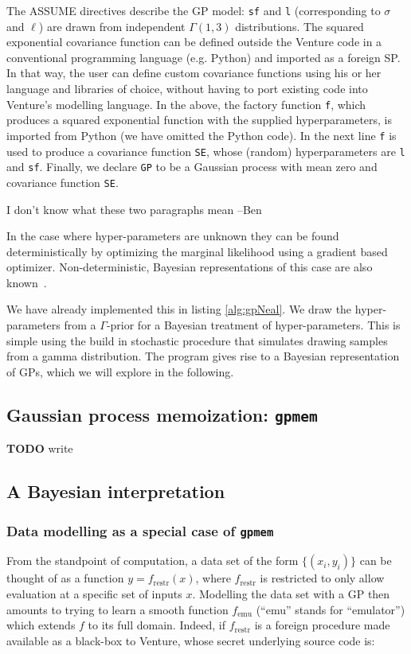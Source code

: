 \documentclass{article} %
\newcommand{\gpmem}{\texttt{gpmem}}
\newcommand{\emu}{{\textrm{emu}}}
\newcommand{\restr}{{\textrm{restr}}}
\begin{document}
The ASSUME directives describe the GP model: \texttt{sf} and \texttt{l} (corresponding to $\sigma$ and $\ell$) are drawn from independent $\Gamma(1,3)$ distributions.
The squared exponential covariance function can be defined outside the Venture code in a conventional programming language (e.g. Python) and imported as a foreign SP.
In that way, the user can define custom covariance functions using his or her language and libraries of choice, without having to port existing code into Venture's modelling language.
In the above, the factory function \texttt{f}, which produces a squared exponential function with the supplied hyperparameters, is imported from Python (we have omitted the Python code).
In the next line \texttt{f} is used to produce a covariance function \texttt{SE}, whose (random) hyperparameters are \texttt{l} and \texttt{sf}.
Finally, we declare \texttt{GP} to be a Gaussian process with mean zero and covariance function \texttt{SE}.





{\color{red} I don't know what these two paragraphs mean --Ben}

In the case where hyper-parameters are unknown they can be found deterministically by optimizing the marginal likelihood using a gradient based optimizer. Non-deterministic, Bayesian representations of this case are also known~\citep{neal1997monte}. 

We have already implemented this in listing \ref{alg:gpNeal}. We draw the hyper-parameters from a $\Gamma$-prior for a Bayesian treatment of hyper-parameters. This is simple using the build in stochastic procedure that simulates drawing samples from a gamma distribution.
The program gives rise to a Bayesian representation of GPs, which we will explore in the following.

\subsection{Gaussian process memoization: \gpmem}
{\bf TODO} write

\subsection{A Bayesian interpretation}


\subsubsection{Data modelling as a special case of \gpmem}\label{sec:special-case-gpmem}
From the standpoint of computation, a data set of the form $\{(x_i, y_i)\}$ can be thought of as a function $y = f_\restr(x)$, where $f_\restr$ is restricted to only allow evaluation at a specific set of inputs $x$.
Modelling the data set with a GP then amounts to trying to learn a smooth function $f_\emu$ (``emu'' stands for ``emulator'') which extends $f$ to its full domain.
Indeed, if $f_\restr$ is a foreign procedure made available as a black-box to Venture, whose secret underlying source code is:
\end{document}
